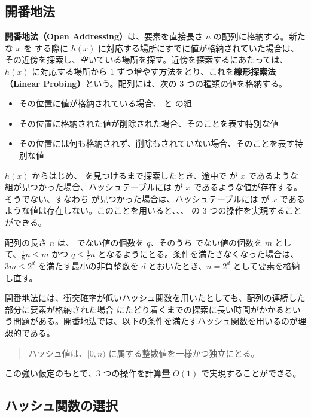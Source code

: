 \documentclass[dvipdfmx,a4j,10pt]{jarticle}
\begin{document}
\subsection{開番地法}
\label{開番地法}

\textbf{開番地法（Open Addressing）}\cite{データ構造}は、要素を直接長さ $n$ の配列に格納する。新たな  $x$ を  する際に $h(x)$ に対応する場所にすでに値が格納されていた場合は、その近傍を探索し、空いている場所を探す。近傍を探索するにあたっては、$h(x)$ に対応する場所から $1$ ずつ増やす方法をとり、これを\textbf{線形探索法（Linear Probing）}という。配列には、次の $3$ つの種類の値を格納する。

\begin{itemize}
  \item その位置に値が格納されている場合、 と  の組
  \item その位置に格納された値が削除された場合、そのことを表す特別な値 
  \item その位置には何も格納されず、削除もされていない場合、そのことを表す特別な値 
\end{itemize}

$h(x)$ からはじめ、 を見つけるまで探索したとき、途中で  が $x$ であるような組が見つかった場合、ハッシュテーブルには  が $x$ であるような値が存在する。そうでない、すなわち  が見つかった場合は、ハッシュテーブルには  が $x$ であるような値は存在しない。このことを用いると、、、 の $3$ つの操作を実現することができる。

配列の長さ $n$ は、 でない値の個数を $q$、そのうち  でない値の個数を $m$ として、$\displaystyle \frac{1}{8} n \leq m$ かつ $\displaystyle q \leq \frac{1}{2} n$ となるようにとる。条件を満たさなくなった場合は、$3m \leq 2^d$ を満たす最小の非負整数を $d$ とおいたとき、$n = 2^d$ として要素を格納し直す。

開番地法には、衝突確率が低いハッシュ関数を用いたとしても、配列の連続した部分に要素が格納された場合  にたどり着くまでの探索に長い時間がかかるという問題がある。開番地法では、以下の条件を満たすハッシュ関数を用いるのが理想的である。
\begin{quotation}
\noindent ハッシュ値は、$[0, n)$ に属する整数値を一様かつ独立にとる。
\end{quotation}
この強い仮定のもとで、$3$ つの操作を計算量 $O(1)$ で実現することができる。

\subsection{ハッシュ関数の選択}
\label{ハッシュ関数の選択}
\end{document}

